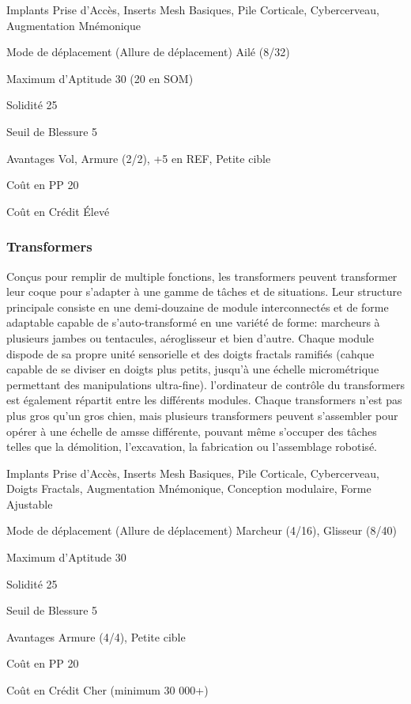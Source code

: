 \begin{description*}
   \item[Implants] Prise d'Accès, Inserts Mesh Basiques, Pile Corticale, Cybercerveau, Augmentation Mnémonique
   \item[Mode de déplacement](Allure de déplacement) Ailé (8/32)
   \item[Maximum d'Aptitude] 30 (20 en SOM)
   \item[Solidité] 25
   \item[Seuil de Blessure] 5
   \item[Avantages] Vol, Armure (2/2), +5 en REF, Petite cible
   \item[Coût en PP] 20
   \item[Coût en Crédit] Élevé
\end{description*} 

\subsubsection{Transformers} \label{sec:starting-flexbots} 

Conçus pour remplir de multiple fonctions, les transformers peuvent transformer leur coque pour s'adapter à une gamme de tâches et de situations. Leur structure principale consiste en une demi-douzaine de module interconnectés et de forme adaptable capable de s'auto-transformé en une variété de forme: marcheurs à plusieurs jambes ou tentacules, aéroglisseur et bien d'autre. Chaque module dispode de sa propre unité sensorielle et des doigts fractals ramifiés (cahque capable de se diviser en doigts plus petits, jusqu'à une échelle micrométrique permettant des manipulations ultra-fine). l'ordinateur de contrôle du transformers est également répartit entre les différents modules. Chaque transformers n'est pas plus gros qu'un gros chien, mais plusieurs transformers peuvent s'assembler pour opérer à une échelle de amsse différente, pouvant même s'occuper des tâches telles que la démolition, l'excavation, la fabrication ou l'assemblage robotisé. 

\begin{description*} 
   \item[Implants] Prise d'Accès, Inserts Mesh Basiques, Pile Corticale, Cybercerveau, Doigts Fractals, Augmentation Mnémonique, Conception modulaire, Forme Ajustable
   \item[Mode de déplacement](Allure de déplacement) Marcheur (4/16), Glisseur (8/40)
   \item[Maximum d'Aptitude] 30
   \item[Solidité] 25 
   \item[Seuil de Blessure] 5
   \item[Avantages] Armure (4/4), Petite cible
   \item[Coût en PP] 20
   \item[Coût en Crédit] Cher (minimum 30 000+)
\end{description*} 


